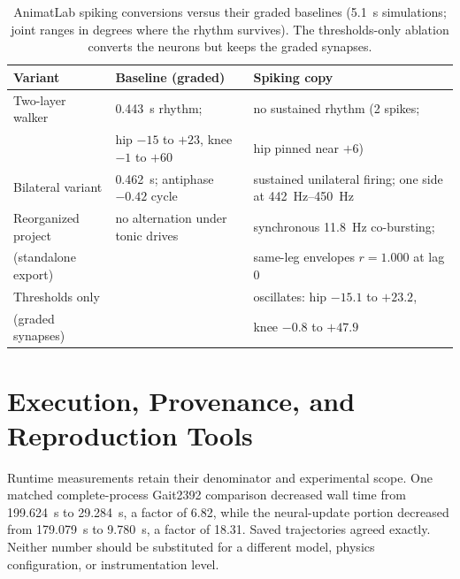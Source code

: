 \begin{table}[htbp]
\caption{AnimatLab spiking conversions versus their graded baselines (\qty{5.1}{\second} simulations; joint ranges in degrees where the rhythm survives). The thresholds-only ablation converts the neurons but keeps the graded synapses.}
\label{tab:spike_animatlab}
\small
\begin{tabularx}{\textwidth}{@{}p{}>{\raggedright\arraybackslash}X>{\raggedright\arraybackslash}X@{}}
\toprule
\textbf{Variant} & \textbf{Baseline (graded)} & \textbf{Spiking copy} \\
\midrule
Two-layer walker     & \qty{0.443}{\second} rhythm;   & no sustained rhythm (2 spikes; \\
                     & hip $-15$ to $+23$, knee $-1$ to $+60$ & hip pinned near $+6$) \\
Bilateral variant    & \qty{0.462}{\second}; antiphase $-0.42$ cycle & sustained unilateral firing; one side at \qtyrange{442}{450}{\hertz} \\
Reorganized project  & no alternation under tonic drives & synchronous \qty{11.8}{\hertz} co-bursting; \\
(standalone export)  &                        & same-leg envelopes $r = 1.000$ at lag 0 \\
Thresholds only      & \multirow{2}{=}{hip $-15$ to $+23$, knee $-1$ to $+60$} & oscillates: hip $-15.1$ to $+23.2$, \\
(graded synapses)    &                        & knee $-0.8$ to $+47.9$ \\
\bottomrule
\end{tabularx}
\end{table}




\section{Execution, Provenance, and Reproduction Tools}\label{sec:app_execution_provenance}

Runtime measurements retain their denominator and experimental scope. One matched complete-process Gait2392 comparison decreased wall time from \qty{199.624}{\second} to \qty{29.284}{\second}, a factor of 6.82, while the neural-update portion decreased from \qty{179.079}{\second} to \qty{9.780}{\second}, a factor of 18.31. Saved trajectories agreed exactly. Neither number should be substituted for a different model, physics configuration, or instrumentation level.

